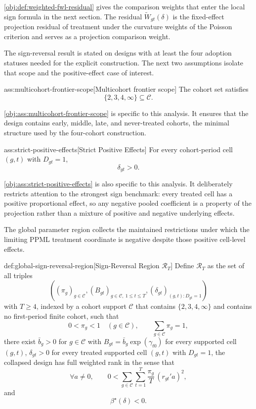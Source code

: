 \cref{obj:def:weighted-fwl-residual} gives the comparison weights that enter the local sign formula in the next section. The residual \(\widetilde W_{gt}(\delta)\) is the fixed-effect projection residual of treatment under the curvature weights of the Poisson criterion and serves as a projection comparison weight.

The sign-reversal result is stated on designs with at least the four adoption statuses needed for the explicit construction. The next two assumptions isolate that scope and the positive-effect case of interest.

\begin{assumptionv}{ass:multicohort-frontier-scope}[Multicohort frontier scope]
The cohort set satisfies
\[
\{2,3,4,\infty\}\subseteq \mathcal C.
\]
\end{assumptionv}

\cref{obj:ass:multicohort-frontier-scope} is specific to this analysis. It ensures that the design contains early, middle, late, and never-treated cohorts, the minimal structure used by the four-cohort construction.

\begin{assumptionv}{ass:strict-positive-effects}[Strict Positive Effects]
For every cohort-period cell \((g,t)\) with \(D_{gt}=1\),
\[
\delta_{gt}>0.
\]
\end{assumptionv}

\cref{obj:ass:strict-positive-effects} is also specific to this analysis. It deliberately restricts attention to the strongest sign benchmark: every treated cell has a positive proportional effect, so any negative pooled coefficient is a property of the projection rather than a mixture of positive and negative underlying effects.

The global parameter region collects the maintained restrictions under which the limiting PPML treatment coordinate is negative despite those positive cell-level effects.

\begin{definitionv}{def:global-sign-reversal-region}[Sign-Reversal Region \(\mathcal R_T\)]
Define \(\mathcal R_T\) as the set of all triples
\[
\left((\pi_g)_{g\in\mathcal C},(B_{gt})_{g\in\mathcal C,\ 1\le t\le T},(\delta_{gt})_{(g,t):D_{gt}=1}\right)
\]
with \(T\ge 4\), indexed by a cohort support \(\mathcal C\) that contains \(\{2,3,4,\infty\}\) and contains no first-period finite cohort, such that
\[
0<\pi_g<1\quad(g\in\mathcal C),\qquad \sum_{g\in\mathcal C}\pi_g=1,
\]
there exist \(\bar b_g>0\) for \(g\in\mathcal C\) with \(B_{gt}=\bar b_g\exp(\gamma_{t0})\) for every supported cell \((g,t)\), \(\delta_{gt}>0\) for every treated supported cell \((g,t)\) with \(D_{gt}=1\), the collapsed design has full weighted rank in the sense that
\[
\forall a\ne 0,\qquad
0<\sum_{g\in\mathcal C}\sum_{t=1}^T \frac{\pi_g}{T}\,(r_{gt}'a)^2,
\]
and
\[
\beta^\star(\delta)<0.
\]
\end{definitionv}

